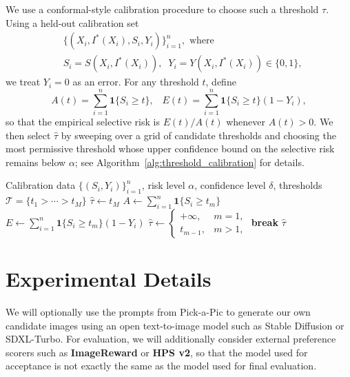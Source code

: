 \documentclass[twocolumn,11pt]{article}
\newcommand{\TODO}[1]{\textcolor{red}{\textbf{TODO:} #1}}
\theoremstyle{plain}
\theoremstyle{definition}
\theoremstyle{remark}
\newcommand{\mx}[1]{\textcolor{brown}{[Minxing]: #1}}
\begin{document}
We use a conformal-style calibration procedure to choose such a threshold \(\tau\). Using a held-out calibration set
\begin{align*}
&\{(X_i,I^*(X_i),S_i,Y_i)\}_{i=1}^n, \text{ where }
\\
&S_i=S(X_i,I^*(X_i)), \; \;
Y_i=Y(X_i,I^*(X_i))\in\{0,1\},
\end{align*}
we treat \(Y_i=0\) as an error. For any threshold \(t\), define
\[
A(t)=\sum_{i=1}^n \mathbf 1\{S_i\ge t\},
\;\;\;
E(t)=\sum_{i=1}^n \mathbf 1\{S_i\ge t\}(1-Y_i),
\]
so that the empirical selective risk is \(E(t)/A(t)\) whenever \(A(t)>0\). We then select \(\hat\tau\) by sweeping over a grid of candidate thresholds and choosing the most permissive threshold whose upper confidence bound on the selective risk remains below \(\alpha\); see Algorithm~\ref{alg:threshold_calibration} for details.

\begin{algorithm}[!tbh]
\caption{Threshold calibration for selective generation}
\label{alg:threshold_calibration}
\begin{algorithmic}[1]
\Require Calibration data $\{(S_i,Y_i)\}_{i=1}^n$, risk level $\alpha$, confidence level $\delta$, thresholds $\mathcal T=\{t_1>\cdots>t_M\}$
\State $\hat\tau \gets t_M$
    \State $A \gets \sum_{i=1}^n \mathbf{1}\{S_i\ge t_m\}$
    \State $E \gets \sum_{i=1}^n \mathbf{1}\{S_i\ge t_m\}(1-Y_i)$
        \State $\hat\tau \gets \begin{cases}
        +\infty, & m=1,\\
        t_{m-1}, & m>1,
        \end{cases}$
        \State \textbf{break}
    \EndIf
\EndFor
\State \Return $\hat\tau$
\end{algorithmic}
\end{algorithm}

\section{Experimental Details}

We will optionally use the prompts from Pick-a-Pic to generate our own candidate images using an open text-to-image model such as Stable Diffusion or SDXL-Turbo. For evaluation, we will additionally consider external preference scorers such as \textbf{ImageReward} or \textbf{HPS v2}, so that the model used for acceptance is not exactly the same as the model used for final evaluation.
\end{document}
